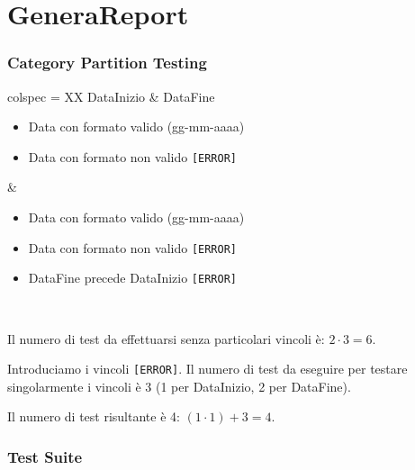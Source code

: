 \section{GeneraReport}

\subsubsection*{Category Partition Testing}

\begin{table}[!ht]
	\centering
	\footnotesize
	\begin{partest}{colspec = XX}
		DataInizio & DataFine\\
		\begin{itemize}[leftmargin=*]
			\item Data con formato valido (gg-mm-aaaa)
			\item Data con formato non valido \texttt{[ERROR]}
		\end{itemize} &
		\begin{itemize}[leftmargin=*]
			\item Data con formato valido (gg-mm-aaaa)
			\item Data con formato non valido \texttt{[ERROR]}
			\item DataFine precede DataInizio \texttt{[ERROR]}
		\end{itemize} \\
	\end{partest}
\end{table}

\noindent Il numero di test da effettuarsi senza particolari vincoli è: $2 \cdot 3 = 6$.

\noindent Introduciamo i vincoli \texttt{[ERROR]}. Il numero di test da eseguire per testare singolarmente i vincoli è 3 (1 per DataInizio, 2 per DataFine).

\noindent Il numero di test risultante è 4: $(1 \cdot 1) + 3 = 4$.

\subsubsection*{Test Suite}

